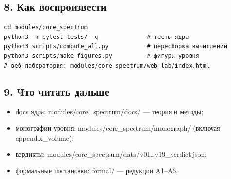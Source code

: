 \documentclass[11pt,a4paper]{article}
\begin{document}
\subsection{8. Как воспроизвести}

\begin{verbatim}
cd modules/core_spectrum
python3 -m pytest tests/ -q              # тесты ядра
python3 scripts/compute_all.py           # пересборка вычислений
python3 scripts/make_figures.py          # фигуры уровня
# веб-лаборатория: modules/core_spectrum/web_lab/index.html
\end{verbatim}

\subsection{9. Что читать дальше}

\begin{itemize}
  \item docs ядра: modules/core\_spectrum/docs/ — теория и методы;
  \item монографии уровня: modules/core\_spectrum/monograph/ (включая appendix\_volume);
  \item вердикты: modules/core\_spectrum/data/v01…v19\_verdict.json;
  \item формальные постановки: formal/ — редукции A1–A6.
\end{itemize}
\end{document}
